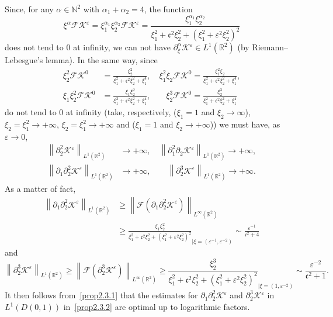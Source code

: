 \documentclass[AHL,Unicode,longabstracts,published]{cedram}
\newcommand*\p{\partial}
\newcommand*\R{\mathbb R}
\newcommand*\N{\mathbb N}
\newcommand*\BK{\mathcal{K}}
\newcommand*\Fou{\mathscr{F}}
\newcommand*\cs{{\mathfrak c}}
\newcommand*\ii{\infty}
\newcommand*\gs{\geqslant }
\newcommand*\e{\varepsilon}
\begin{document}
\begin{rema}
Since, for any $ \alpha \in \N^2 $ with $ \alpha_1 + \alpha_2 = 4 $, the function
\[
\xi^\alpha \Fou \BK^\e = \xi_1^{\alpha_1} \xi_2^{\alpha_2} \Fou \BK^\e = \frac{\xi_1^{\alpha_1} \xi_2^{\alpha_2}}{ \xi_1^2 + \cs^2 \xi_2^2 + \left(\xi_1^2 + \e^2 \xi_2^2\right)^2 }
\]
does not tend to $ 0 $ at infinity, we can not have $ \p_\xi^\alpha \BK^\e \in L^1 (\R^2) $ (by Riemann--Lebesgue's lemma). In the same way, since
\begin{align*}
\xi_2^2 \Fou \BK^0 &= \frac{\xi_2^2}{ \xi_1^2 + \cs^2 \xi_2^2 + \xi_1^4 },
\quad \xi_1^2 \xi_2 \Fou \BK^0 = \frac{\xi_1^2 \xi_2}{ \xi_1^2 + \cs^2 \xi_2^2 + \xi_1^4 },
\\
\xi_1 \xi_2^2 \Fou \BK^0 &= \frac{\xi_1 \xi_2^2}{ \xi_1^2 + \cs^2 \xi_2^2 + \xi_1^4 }, \quad\;\;\;
\xi_2^3 \Fou \BK^0 = \frac{ \xi_2^3}{\xi_1^2 + \cs^2 \xi_2^2 + \xi_1^4}
\end{align*}
do not tend to $ 0 $ at infinity (take, respectively, ($ \xi_1 = 1 $ and $ \xi_2 \to \ii $), $ \xi_2 = \xi_1^2 \to + \ii $, $ \xi_2 = \xi_1^{2} \to + \ii $ and ($ \xi_1 = 1 $ and $ \xi_2 \to +\ii $)) we must have, as $ \e \to 0 $,
\begin{align*}
\left\| \p_2^2 \BK^\e \right\|_{ L^1 (\R^2) } &\to + \ii,
\quad \left\| \p_1^2 \p_2 \BK^\e \right\|_{ L^1 (\R^2) } \to + \ii,
\\
\left\| \p_1 \p_2^2 \BK^\e \right\|_{ L^1 (\R^2) } &\to + \ii,
\qquad \left\| \p_2^3 \BK^\e \right\|_{ L^1 (\R^2) } \to + \ii.
\end{align*}
As a matter of fact,
\begin{align*}
\left\| \p_1 \p_2^2 \BK^\e \right\|_{ L^1 (\R^2) } & \gs \left\| \Fou \left(\p_1 \p_2^2 \BK^\e\right) \right\|_{ L^\ii (\R^2) }
\\ &
\gs \frac{\xi_1 \xi_2^2}{ \xi_1^2 + \cs^2 \xi_2^2 + \left(\xi_1^2 + \e^2 \xi_2^2\right)^2 }_{|\xi = (\e^{-1}, \e^{-2})}
\sim \frac{ \e^{-1} }{ \cs^2 + 4 }
\end{align*}
and
\[
\left\| \p_2^3 \BK^\e \right\|_{ L^1 (\R^2) }
\gs \left\| \Fou \left(\p_2^3 \BK^\e\right) \right\|_{ L^\ii (\R^2) }
\gs \frac{\xi_2^3}{ \xi_1^2 + \cs^2 \xi_2^2 + \left(\xi_1^2 + \e^2 \xi_2^2\right)^2 }_{|\xi = \left(1, \e^{-2}\right)}
\sim \frac{ \e^{-2} }{ \cs^2 + 1 }.
\]
It then follows from~\eqref{prop2.3.1} that the estimates for $ \p_1 \p_2^2 \BK^\e $ and $ \p_2^3 \BK^\e $ in $ L^1 (D(0,1)) $ in~\eqref{prop2.3.2} are optimal up to logarithmic factors.
\end{rema}
\end{document}
